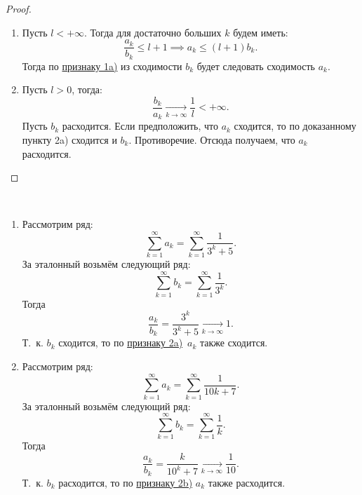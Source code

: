 \documentclass[../../main.tex]{subfiles}
\begin{document}
 \begin{proof}
 
 ~
 
	\begin{enumerate}[label={\alph*)}]
	\item Пусть $l< +\infty$.
	Тогда для достаточно больших $k$ будем иметь:
	 \[
	 	\frac{a_k}{b_k} \leq l + 1  \implies a_k \leq (l+1)b_k
	 .\]
	Тогда по \hyperref[lec26:comp_test_1]{признаку  1\textdegree a)} из 
	 сходимости $b_k$ будет следовать сходимость $a_k$.
	\item Пусть $l > 0$, тогда:
	\[
	\frac{b_k}{a_k} \xrightarrow[k \to \infty]{} \frac{1}{l} < +\infty
	.\]
	Пусть $b_k$ расходится. Если предположить,
	что $a_k$  сходится, то по доказанному пункту
	2\textdegree a) сходится и $b_k$. Противоречие.
	Отсюда получаем, что $a_k$ расходится. \qedhere
	\end{enumerate}
\end{proof}
\begin{examples}

~

\begin{enumerate}
\item
Рассмотрим ряд:
	\[
		 \sum\limits_{k = 1}^\infty a_k=  \sum\limits_{k = 1}^\infty\frac{1}{3^k + 5}
	.\]
	За эталонный возьмём следующий ряд:
	\[
		\sum\limits_{k = 1}^\infty b_k=   \sum\limits_{k = 1}^\infty\frac{1}{3^k}
	.\]
	Тогда \[\frac{a_k}{b_k} = \frac{3^k}{3^k + 5} \xrightarrow[k \to \infty]{} 
	1.\]
	Т.~к. $b_k$ сходится, то по  
	 \hyperref[lec26:comp_test_2]{признаку  2\textdegree a)}\ $a_k$ также 
	 сходится.
\item
	Рассмотрим ряд:
	\[
		 \sum\limits_{k = 1}^\infty a_k=  \sum\limits_{k = 1}^\infty\frac{1}{10k + 7}
	.\]
	За эталонный возьмём следующий ряд:
	\[
		\sum\limits_{k = 1}^\infty b_k=   \sum\limits_{k = 1}^\infty\frac{1}{k}
	.\]
	Тогда \[\frac{a_k}{b_k} = \frac{k}{10^k + 7} \xrightarrow[k \to \infty]{} 
	\frac{1}{10}.\] 
	Т.~к. $b_k$ расходится, то по  
	 \hyperref[lec26:comp_test_2]{признаку  2\textdegree b)}
	 $a_k$ также расходится.
\end{enumerate}
\end{examples}
\end{document}
